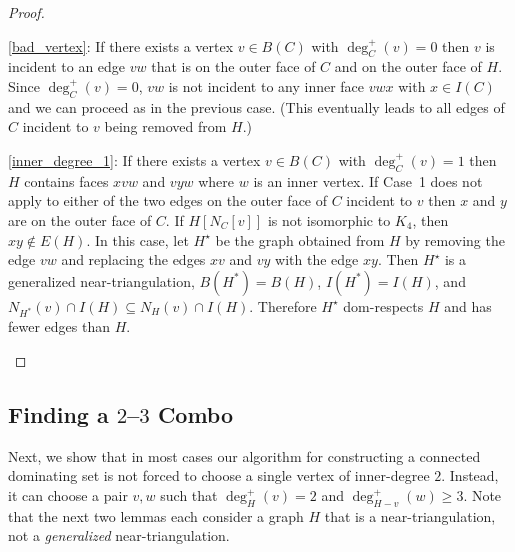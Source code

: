 \documentclass[11pt]{article}
\newcommand{\pat}[1]{\textcolor{red}{PM: #1}}
\newcommand{\hussein}[1]{\textcolor{purple}{HH: #1}}
\theoremstyle{definition}
\begin{document}
\begin{proof}
\begin{compactenum}
    \item \cref{bad_vertex}: If there exists a vertex $v\in B(C)$ with $\deg^+_C(v)=0$ then $v$ is incident to an edge $vw$ that is on the outer face of $C$ and on the outer face of $H$. Since $\deg^+_C(v)=0$, $vw$ is not incident to any inner face $vwx$ with $x\in I(C)$ and we can proceed as in the previous case.  (This eventually leads to all edges of $C$ incident to $v$ being removed from $H$.)

    \item \cref{inner_degree_1}: If there exists a vertex $v\in B(C)$ with $\deg^+_C(v)=1$ then $H$ contains faces $xvw$ and $vyw$ where $w$ is an inner vertex.  If Case~1 does not apply to either of the two edges on the outer face of $C$ incident to $v$ then $x$ and $y$ are on the outer face of $C$. If $H[N_C[v]]$ is not isomorphic to $K_4$, then $xy\not\in E(H)$.  In this case, let $H^\star$ be the graph obtained from $H$ by removing the edge $vw$ and replacing the edges $xv$ and $vy$ with the edge $xy$. Then $H^\star$ is a generalized near-triangulation, $B(H^*)=B(H)$, $I(H^*)=I(H)$, and $N_{H^*}(v)\cap I(H)\subseteq N_{H}(v)\cap I(H)$.  Therefore $H^\star$ dom-respects $H$ and has fewer edges than $H$. \qedhere

  \end{compactenum}
\end{proof}

\subsection{Finding a $2$--$3$ Combo}
\label{combo}

Next, we show that in most cases our algorithm for constructing a connected dominating set is not forced to choose a single vertex of inner-degree $2$. Instead, it can choose a pair $v,w$ such that $\deg^+_H(v)=2$ and $\deg^+_{H-v}(w)\ge 3$. Note that the next two lemmas each consider a graph $H$ that is a near-triangulation, not a \emph{generalized} near-triangulation.
\end{document}
